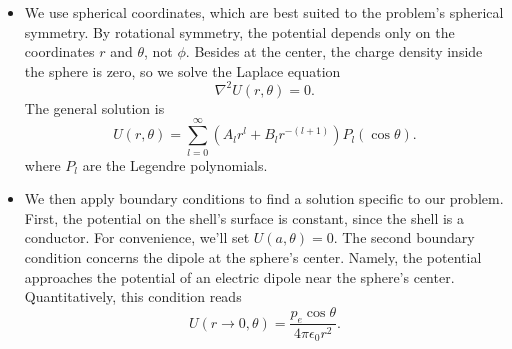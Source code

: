 \documentclass[11pt, a4paper]{article}
\newcommand{\ee}{\epsilon_{0}}  %
\renewcommand{\laplacian}{\nabla^{2}}
\begin{document}
\begin{itemize}
	\item We use spherical coordinates, which are best suited to the problem's spherical symmetry. By rotational symmetry, the potential depends only on the coordinates $ r $ and $ \theta $, not $ \phi $. Besides at the center, the charge density inside the sphere is zero, so we solve the Laplace equation
	\begin{equation*}
		\laplacian U(r, \theta) = 0.
	\end{equation*}
	The general solution is
	\begin{equation*}
		U(r, \theta) = \sum_{l = 0}^{\infty}\left(A_{l}r^{l} + B_{l}r^{-(l+1)}\right)P_{l}(\cos \theta).
	\end{equation*}
	where $ P_{l} $ are the Legendre polynomials. 
	
	\item We then apply boundary conditions to find a solution specific to our problem. First, the potential on the shell's surface is constant, since the shell is a conductor. For convenience, we'll set $ U(a, \theta) = 0 $. The second boundary condition concerns the dipole at the sphere's center. Namely, the potential approaches the potential of an electric dipole near the sphere's center. Quantitatively, this condition reads
	\begin{equation*}
		U(r \to 0, \theta) = \frac{p_{e}\cos \theta}{4\pi \ee r^{2}}.
	\end{equation*}
	

\end{itemize}
\end{document}
